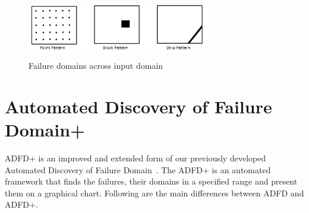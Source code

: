 \documentclass{acm_proc_article-sp}
\begin{document}
\begin{figure}[ht]                                    
\centering
\includegraphics[width= 8cm,height=2.5cm]{ART_Patterns.png}
\caption{Failure domains across input domain~\cite{chan1996proportional}}
\label{fig:failurePatterns}
\end{figure}



 


\section{Automated Discovery of Failure Domain+}\label{sec:adfd+}
ADFD+ is an improved and extended form of our previously developed Automated Discovery of Failure Domain~\cite{ahmad2013adfd}. The ADFD+ is an automated framework that finds the failures, their domains in a specified range and present them on a graphical chart. Following  are the main differences between ADFD and ADFD+.
\end{document}
